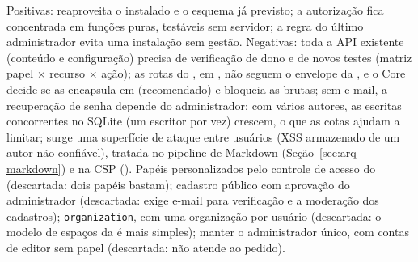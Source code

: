 {Positivas: reaproveita o  instalado e o esquema já previsto; a autorização fica concentrada em funções puras, testáveis sem servidor; a regra do último administrador evita uma instalação sem gestão. Negativas: toda a API existente (conteúdo e configuração) precisa de verificação de dono e de novos testes (matriz papel $\times$ recurso $\times$ ação); as rotas do , em , não seguem o envelope da , e o Core decide se as encapsula em  (recomendado) e bloqueia as brutas; sem e-mail, a recuperação de senha depende do administrador; com vários autores, as escritas concorrentes no SQLite (um escritor por vez) crescem, o que as cotas ajudam a limitar; surge uma superfície de ataque entre usuários (XSS armazenado de um autor não confiável), tratada no pipeline de Markdown (Seção~\ref{sec:arq-markdown}) e na CSP ().}
{Papéis personalizados pelo controle de acesso do  (descartada: dois papéis bastam); cadastro público com aprovação do administrador (descartada: exige e-mail para verificação e a moderação dos cadastros);  \texttt{organization}, com uma organização por usuário (descartada: o modelo de espaços da  é mais simples); manter o administrador único, com contas de editor sem papel (descartada: não atende ao pedido).}

